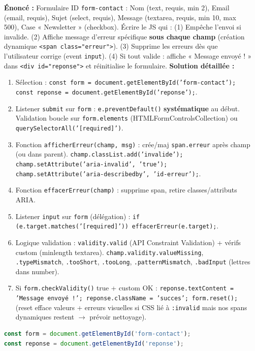\documentclass[11pt]{article}
\begin{document}
\begin{exoresolu}
    \textbf{Énoncé :} Formulaire ID \texttt{form-contact} : Nom (text, requis, min 2), Email (email, requis), Sujet (select, requis), Message (textarea, requis, min 10, max 500), Case « Newsletter » (checkbox). Écrire le JS qui : (1) Empêche l'envoi si invalide. (2) Affiche message d'erreur spécifique \textbf{sous chaque champ} (création dynamique \texttt{<span class="erreur">}). (3) Supprime les erreurs dès que l'utilisateur corrige (event \texttt{input}). (4) Si tout valide : affiche « Message envoyé ! » dans \texttt{<div id="reponse">} et réinitialise le formulaire.
    \tcblower
    \textbf{Solution détaillée :}
    \begin{enumerate}
        \item Sélection : \texttt{const form = document.getElementById('form-contact'); const reponse = document.getElementById('reponse');}.
        \item Listener \texttt{submit} sur \texttt{form} : \texttt{e.preventDefault()} \textbf{systématique} au début. Validation boucle sur \texttt{form.elements} (HTMLFormControlsCollection) ou \texttt{querySelectorAll('[required]')}.
        \item Fonction \texttt{afficherErreur(champ, msg)} : crée/maj \texttt{span.erreur} après champ (ou dans parent). \texttt{champ.classList.add('invalide'); champ.setAttribute('aria-invalid', 'true'); champ.setAttribute('aria-describedby', 'id-erreur');}.
        \item Fonction \texttt{effacerErreur(champ)} : supprime span, retire classes/attributs ARIA.
        \item Listener \texttt{input} sur \texttt{form} (délégation) : \texttt{if (e.target.matches('[required]')) effacerErreur(e.target);}.
        \item Logique validation : \texttt{validity.valid} (API Constraint Validation) + vérifs custom (minlength textarea). \texttt{champ.validity.valueMissing}, \texttt{.typeMismatch}, \texttt{.tooShort}, \texttt{.tooLong}, \texttt{.patternMismatch}, \texttt{.badInput} (lettres dans number).
        \item Si \texttt{form.checkValidity()} true + custom OK : \texttt{reponse.textContent = 'Message envoyé !'; reponse.className = 'succes'; form.reset();} (reset efface valeurs + erreurs visuelles si CSS lié à \texttt{:invalid} mais nos spans dynamiques restent $\rightarrow$ prévoir nettoyage).
    \end{enumerate}
    \begin{lstlisting}[language=JavaScript]
const form = document.getElementById('form-contact');
const reponse = document.getElementById('reponse');


\end{lstlisting}
\end{exoresolu}
\end{document}
